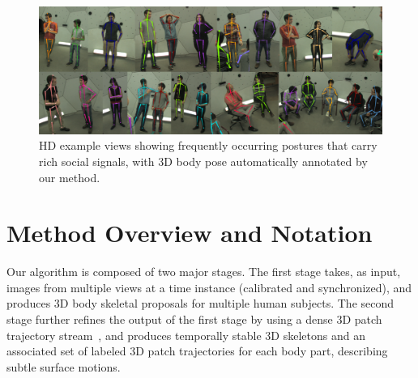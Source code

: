 

\begin{figure}[t]
	\includegraphics[width=\linewidth]{figures/iconicSocialPose}
	\caption{HD example views showing frequently occurring postures that carry rich social signals, with 3D body pose automatically annotated by our method.} 
	\label{fig:iconicPoses}
\end{figure}

\section{Method Overview and Notation}
Our algorithm is composed of two major stages. The first stage takes, as input, images from multiple views at a time instance (calibrated and synchronized), and produces 3D body skeletal proposals for multiple human subjects. The second stage further refines the output of the first stage by using a dense 3D patch trajectory stream~\cite{Joo2014}, and produces temporally stable 3D skeletons and an associated set of labeled 3D patch trajectories for each body part, describing subtle surface motions.

